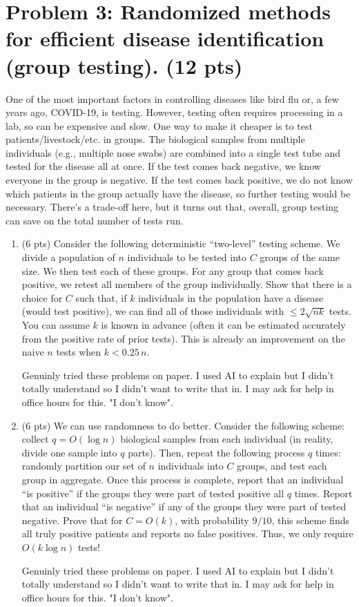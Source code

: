 \documentclass[11pt]{article}
\begin{document}
\section*{Problem 3: Randomized methods for efficient disease identification (group testing). (12 pts)}
One of the most important factors in controlling diseases like bird flu or, a few years ago, COVID-19, is testing. However, testing often requires processing in a lab, so can be expensive and slow. One way to make it cheaper is to test patients/livestock/etc.
in groups. The biological samples from multiple individuals (e.g., multiple nose swabs) are combined into a single test tube and tested for the disease all at once. If the test comes back negative, we know everyone in the group is negative. If the test comes back positive, we do not know which patients in the group actually have the disease, so further testing would be necessary. There's a trade-off here, but it turns out that, overall, group testing can save on the total number of tests run.

\begin{enumerate}[label=\arabic*.]
	\item (6 pts) Consider the following deterministic ``two-level'' testing scheme. We divide a population of $n$ individuals to be tested into $C$ groups of the same size. We then test each of these groups. For any group that comes back positive, we retest all members of the group individually. Show that there is a choice for $C$ such that, if $k$ individuals in the population have a disease (would test positive), we can find all of those individuals with $\le 2\sqrt{nk}$ tests. You can assume $k$ is known in advance (often it can be estimated accurately from the positive rate of prior tests). This is already an improvement on the naive $n$ tests when $k<0.25\,n$.

Genuinly tried these problems on paper. I used AI to explain but I didn't totally understand so I didn't want to write that in. I may ask for help in office hours for this. "I don't know".

	\item (6 pts) We can use randomness to do better. Consider the following scheme: collect $q=O(\log n)$ biological samples from each individual (in reality, divide one sample into $q$ parts). Then, repeat the following process $q$ times: randomly partition our set of $n$ individuals into $C$ groups, and test each group in aggregate. Once this process is complete, report that an individual ``is positive'' if the groups they were part of tested positive all $q$ times. Report that an individual ``is negative'' if any of the groups they were part of tested negative. Prove that for $C=O(k)$, with probability $9/10$, this scheme finds all truly positive patients and reports no false positives. Thus, we only require $O(k\log n)$ tests!

Genuinly tried these problems on paper. I used AI to explain but I didn't totally understand so I didn't want to write that in. I may ask for help in office hours for this. "I don't know".
\end{enumerate}
\end{document}
